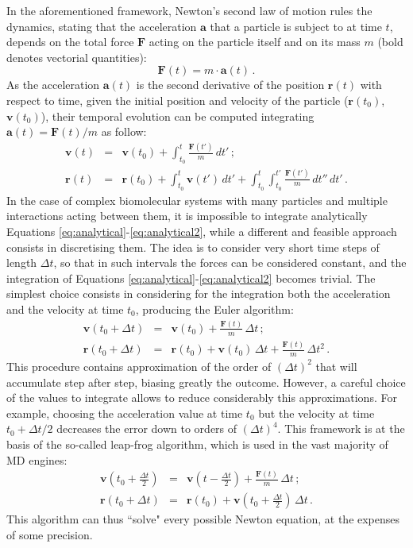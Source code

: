 In the aforementioned framework, Newton's second law of motion rules the dynamics, stating that the acceleration $\textbf{a}$ that a particle is subject to at time $t$, depends on the total force $\textbf{F}$ acting on the particle itself and on its mass $m$ (bold denotes vectorial quantities):
\begin{equation} \label{eq:newton}
\textbf{F}(t) =  m \cdot \textbf{a}(t) \, .
\end{equation}
As the acceleration $\textbf{a}(t)$ is the second derivative of the position $\textbf{r}(t)$ with respect to time, given the initial position and velocity of the particle ($\textbf{r}(t_0)$, $\textbf{v}(t_0)$), their temporal evolution can be computed integrating $\textbf{a}(t) = \textbf{F}(t)/m$ as follow:
\begin{eqnarray} \label{eq:analytical}
\mathbf{v}(t) &=& \mathbf{v}(t_0) + \int_{t_0}^t \frac{\mathbf{F}(t')}{m} \, dt' \, ; \\
\mathbf{r}(t) &=& \mathbf{r}(t_0) + \int_{t_0}^t \mathbf{v}(t') \, dt' + \int_{t_0}^t \int_{t_0}^{t'} \frac{\mathbf{F}(t')}{m} \, dt'' \, dt'\, . \label{eq:analytical2}
\end{eqnarray}
%
In the case of complex biomolecular systems with many particles and multiple interactions acting between them, it is impossible to integrate analytically Equations \ref{eq:analytical}-\ref{eq:analytical2}, while a different and feasible approach consists in discretising them.
%
The idea is to consider very short time steps of length $\Delta t$, so that in such intervals the forces can be considered constant, and the integration of Equations \ref{eq:analytical}-\ref{eq:analytical2} becomes trivial.
%
The simplest choice consists in considering for the integration both the acceleration and the velocity at time $t_0$, producing the Euler algorithm:
\begin{eqnarray} \label{eq:euler}
\mathbf{v}(t_0 + \Delta t) &=& \mathbf{v}(t_0) + \frac{\mathbf{F}(t)}{m} \, \Delta t \,; \\
\mathbf{r}(t_0 + \Delta t) &=& \mathbf{r}(t_0) + \mathbf{v}(t_0) \, \Delta t + \frac{\mathbf{F}(t)}{m} \, \Delta t^2 \,. \label{eq:euler2}
\end{eqnarray}
%
This procedure contains approximation of the order of $(\Delta t)^2$ that will accumulate step after step, biasing greatly the outcome. However, a careful choice of the values to integrate allows to reduce considerably this approximations. For example, choosing the acceleration value at time $t_0$ but the velocity at time $t_0 + \Delta t/2$ decreases the error down to orders of $(\Delta t)^4$. This framework is at the basis of the so-called leap-frog algorithm, which is used in the vast majority of MD engines:
\begin{eqnarray}
\mathbf{v}\left(t_0 + \frac{\Delta t}{2}\right) &=& \mathbf{v}\left(t - \frac{\Delta t}{2}\right) + \frac{\mathbf{F}(t)}{m} \, \Delta t \, ; \\
\mathbf{r}(t_0 + \Delta t) &=& \mathbf{r}(t_0) + \mathbf{v}\left(t_0 + \frac{\Delta t}{2}\right) \, \Delta t \, .
\end{eqnarray}
This algorithm can thus ``solve" every possible Newton equation, at the expenses of some precision.

